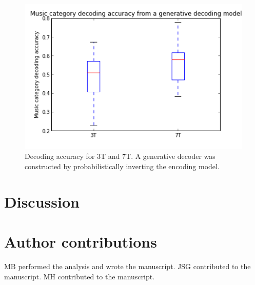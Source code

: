  
 
 
 
\begin{figure}
	\centering
	\includegraphics[width=\linewidth]{pics/decoding_accuracy}
	\caption{Decoding accuracy for 3T and 7T. A generative decoder was constructed by probabilistically inverting the encoding model.}
	\label{fig:decoder}
\end{figure}


\section*{Discussion}





\section*{Author contributions}

MB performed the analysis and wrote the manuscript.
JSG contributed to the manuscript.
MH contributed to the manuscript.

